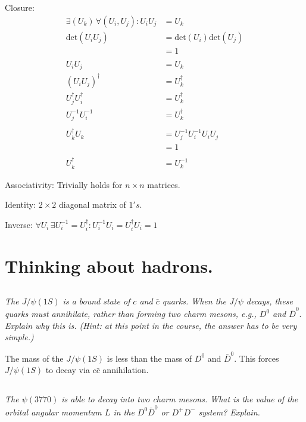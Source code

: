 \documentclass{article}
\begin{document}
Closure: 
\begin{align*}
    \exists(U_k) \, \forall(U_i,U_j): U_i U_j &= U_k\\
    \mathrm{det}(U_i U_j) &= \mathrm{det}(U_i)\mathrm{det}( U_j)\\
    &= 1\\
    &\\
    U_{i} U_{j}&=U_{k}\\
    (U_{i} U_{j})^\dagger &=U_{k}^\dagger\\
    U_{j}^\dagger U_{i}^\dagger &=U_{k}^\dagger\\
    U_{j}^{-1} U_{i}^{-1} &=U_{k}^\dagger\\
    &\\
    U_{k}^{\dagger} U_{k} &=U_{j}^{-1} U_{i}^{-1} U_{i}U_{j}\\
    &=1\\
    &\\
    U_{k}^{\dagger} &=  U_{k}^{-1}
\end{align*}


Associativity: Trivially holds for $n\times n$ matrices.

Identity: $2\times 2$ diagonal matrix of $1's$.

Inverse: $\forall U_i \, \exists U_i^{-1} = U_i^\dagger:  U_i^{-1}  U_i = U_i^{\dagger} U_i = 1$

\newpage


\section{Thinking about hadrons.}
\subsection{}
\textit{The $J / \psi(1 S)$ is a bound state of $c$ and $\bar{c}$ quarks. When the $J / \psi$ decays, these quarks must annihilate, rather than forming two charm mesons, e.g., $D^{0}$ and $\bar{D}^{0} .$ Explain why this is. (Hint: at this point in the course, the answer has to be very simple.) }

The mass of the $J / \psi(1 S)$ is less than the mass of $D^{0}$ and $\bar{D}^{0}$. This forces $J / \psi(1 S)$ to decay via $c\bar c$ annihilation.  


\subsection{}
\textit{The $\psi(3770)$ is able to decay into two charm mesons. What is the value of the orbital angular momentum $L$ in the $D^{0} \bar{D}^{0}$ or $D^{+} D^{-}$ system? Explain. }    
\end{document}
